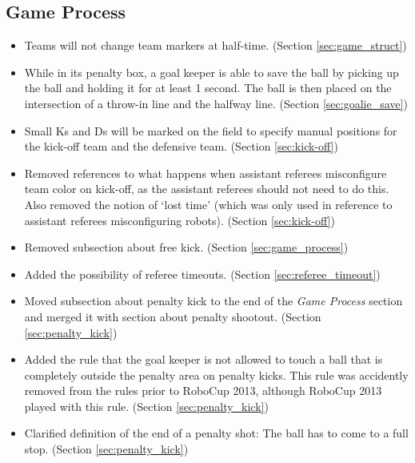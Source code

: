 \documentclass[12pt]{article}
\begin{document}
\subsection*{Game Process}
\begin{itemize}
	\item Teams will not change team markers at half-time. (Section \ref{sec:game_struct})
	\item While in its penalty box, a goal keeper is able to save the ball by picking up the ball and holding it for at least 1 second.  The ball is then placed on the intersection of a throw-in line and the halfway line. (Section \ref{sec:goalie_save}) 
	\item Small Ks and Ds will be marked on the field to specify manual positions for the kick-off team and the defensive team. (Section \ref{sec:kick-off})
	\item Removed references to what happens when assistant referees misconfigure team color on kick-off, as the assistant referees should not need to do this.  Also removed the notion of `lost time' (which was only used in reference to assistant referees misconfiguring robots). (Section \ref{sec:kick-off})
	\item Removed subsection about free kick. (Section \ref{sec:game_process})
  \item Added the possibility of referee timeouts. (Section \ref{sec:referee_timeout})
	\item Moved subsection about penalty kick to the end of the \textit{Game Process} section and merged it with section about penalty shootout. (Section \ref{sec:penalty_kick})
	\item Added the rule that the goal keeper is not allowed to touch a ball that is completely outside the penalty area on penalty kicks.  This rule was accidently removed from the rules prior to RoboCup 2013, although RoboCup 2013 played with this rule. (Section \ref{sec:penalty_kick})
	\item Clarified definition of the end of a penalty shot: The ball has to come to a full stop. (Section \ref{sec:penalty_kick})
\end{itemize}
\end{document}
